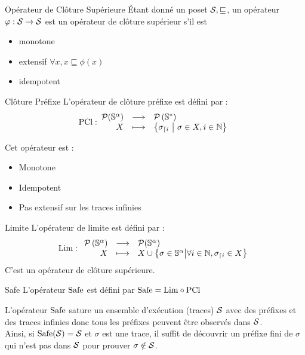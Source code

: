\documentclass{cours}
\begin{document}
\begin{définition}{Opérateur de Clôture Supérieure}{}
Étant donné un poset $\mathcal{S}, \sqsubseteq$, un opérateur $\varphi : \mathcal{S} \to \mathcal{S}$ est un opérateur de clôture supérieur s'il est
\begin{itemize}
	\item monotone
	\item extensif $\forall x, x \sqsubseteq \phi(x)$
	\item idempotent
\end{itemize}
\end{définition}
\begin{définition}{Clôture Préfixe}{}
L'opérateur de clôture préfixe est défini par :
\[
	{\rm PCl :} \begin{array}{rcl}
		\mathcal{P}(\mathbb{S}^{\alpha}) & \longrightarrow & \mathcal{P}\left(\mathbb{S}^{*}\right)                                            \\
		X                & \longmapsto     & \left\{\sigma_{\lceil i}\ \middle|\ \sigma \in X, i\in \mathbb{N}\right\}
	\end{array}
\]
\end{définition}
Cet opérateur est :
\begin{itemize}
	\item Monotone
	\item Idempotent
	\item Pas extensif sur les traces infinies
\end{itemize}

\begin{définition}{Limite}{}
L'opérateur de limite est défini par :
\[ {\rm Lim} :
	\begin{array}{rcl}
		\mathcal{P}\left(\mathbb{S}^{\alpha}\right) & \longrightarrow & \mathcal{P}(\mathbb{S}^{\alpha})                                                                               \\
		X                           & \longmapsto     & X \cup \left\{\sigma \in \mathbb{S}^{\alpha}\middle| \forall i \in \mathbb{N}, \sigma_{\lceil i} \in X\right\}
	\end{array}
\]
C'est un opérateur de clôture supérieure.
\end{définition}

\begin{définition}{Safe}{}
L'opérateur $\rm Safe$ est défini par $\rm Safe = Lim \circ PCl$
\end{définition}
L'opérateur $\rm Safe$ sature un ensemble d'exécution (traces) $\mathcal{S}$ avec des préfixes et des traces infinies donc tous les préfixes peuvent être observés dans $\mathcal{S}$. \\
Ainsi, si ${\rm Safe}(\mathcal{S}) = \mathcal{S}$ et $\sigma$ est une trace, il suffit de découvrir un préfixe fini de $\sigma$ qui n'est pas dans $\mathcal{S}$ pour prouver $\sigma \notin \mathcal{S}$.
\end{document}
